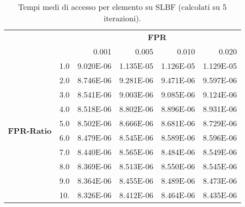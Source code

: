 \documentclass[4apaper,11pt]{report}
\begin{document}
    \begin{table}[H]
        \centering
        \begin{tabular}{llrrrr}
        \toprule
        {} & & \multicolumn{4}{c}{\textbf{FPR}}\\
        {} & &    0.001 &     0.005 &     0.010 &     0.020 \\
        \midrule
        \multirow{10}{*}{\textbf{FPR-Ratio}} &1.0 & 9.020E-06 & 1.135E-05 & 1.126E-05 & 1.129E-05 \\
        &2.0 & 8.746E-06 & 9.281E-06 & 9.471E-06 & 9.597E-06 \\
        &3.0 & 8.541E-06 & 9.003E-06 & 9.085E-06 & 9.124E-06 \\
        &4.0 & 8.518E-06 & 8.802E-06 & 8.896E-06 & 8.931E-06 \\
        &5.0 & 8.502E-06 & 8.666E-06 & 8.681E-06 & 8.729E-06 \\
        &6.0 & 8.479E-06 & 8.545E-06 & 8.589E-06 & 8.596E-06 \\
        &7.0 & 8.440E-06 & 8.565E-06 & 8.484E-06 & 8.549E-06 \\
        &8.0 & 8.369E-06 & 8.513E-06 & 8.550E-06 & 8.545E-06 \\
        &9.0 & 8.364E-06 & 8.455E-06 & 8.489E-06 & 8.473E-06 \\
        &10. & 8.326E-06 & 8.412E-06 & 8.464E-06 & 8.435E-06 \\
        \bottomrule
        \end{tabular}
        \caption{Tempi medi di accesso per elemento su SLBF (calcolati su 5 iterazioni).}
    \end{table}
\end{document}
